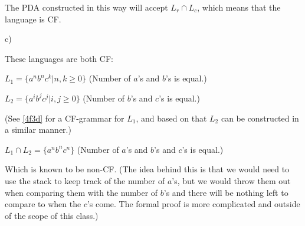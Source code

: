 The PDA constructed in this way will accept $L_r \cap L_c$, which means that the language is CF.

c)

These languages are both CF:

$L_1 = \{a^nb^nc^k | n,k \geq{} 0\}$ (Number of $a$'s and $b$'s is equal.)

$L_2 = \{a^ib^jc^j | i,j \geq{} 0\}$ (Number of $b$'s and $c$'s is equal.)

(See \ref{4f3d} for a CF-grammar for $L_1$, and based on that $L_2$ can be constructed in a similar manner.)

$L_1 \cap L_2 = \{a^nb^nc^n\}$  (Number of $a$'s and $b$'s and $c$'s is equal.)

Which is known to be non-CF. (The idea behind this is that we would need to use the stack to keep track of the number of $a$'s, but we would throw them out when comparing them with the number of $b$'s and there will be nothing left to compare to when the $c$'s come. The formal proof is more complicated and outside of the scope of this class.)